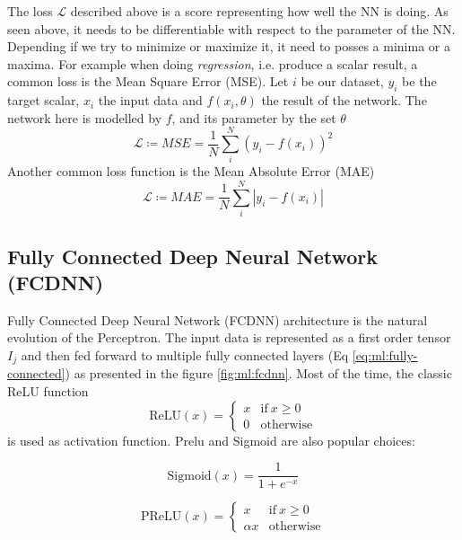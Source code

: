 \documentclass[../main.tex]{subfiles}
\begin{document}
The loss $\mathcal{L}$ described above is a score representing how well the NN is doing. As seen above, it needs to be differentiable with respect to the parameter of the NN. Depending if we try to minimize or maximize it, it need to posses a minima or a maxima. For example when doing \textit{regression}, i.e. produce a scalar result, a common loss is the Mean Square Error (MSE). Let $i$ be our dataset, $y_i$ be the target scalar, $x_i$ the input data and $f(x_i, \mathbb{\theta})$ the result of the network. The network here is modelled by $f$, and its parameter by the set $\mathbb{\theta}$
\begin{equation}
  \mathcal{L} \coloneq MSE = \frac{1}{N} \sum_i^N (y_i - f(x_i))^2
\end{equation}
Another common loss function is the Mean Absolute Error (MAE)
\begin{equation}
  \mathcal{L} \coloneq MAE = \frac{1}{N} \sum_i^N |y_i - f(x_i)|
\end{equation}


\subsection{Fully Connected Deep Neural Network (FCDNN)}
\label{sec:ml:fcdnn}

Fully Connected Deep Neural Network (FCDNN) architecture is the natural evolution of the Perceptron. The input data is represented as a first order tensor $I_j$ and then fed forward to multiple fully connected layers (Eq \ref{eq:ml:fully-connected}) as presented in the figure \ref{fig:ml:fcdnn}. Most of the time, the classic ReLU function
\begin{equation}
  \label{sec:ml:relu}
  \mathrm{ReLU}(x) = \begin{cases}
    x & \mathrm{if} ~ x \geq 0 \\
    0 & \mathrm{otherwise}
  \end{cases}
\end{equation}
is used as activation function. Prelu and Sigmoid are also popular choices:


\begin{minipage}{0.5\linewidth}
  \begin{equation}
    \label{sec:ml:sigmoid}
    \mathrm{Sigmoid}(x) = \frac{1}{1+ e^{-x}}
  \end{equation}
\end{minipage}
\begin{minipage}{0.5\linewidth}
  \begin{equation}
    \label{sec:ml:prelu}
    \mathrm{PReLU}(x) = \begin{cases}
      x & \mathrm{if} ~ x \geq 0 \\
      \alpha x & \mathrm{otherwise}
    \end{cases}
  \end{equation}
\end{minipage}
\end{document}
